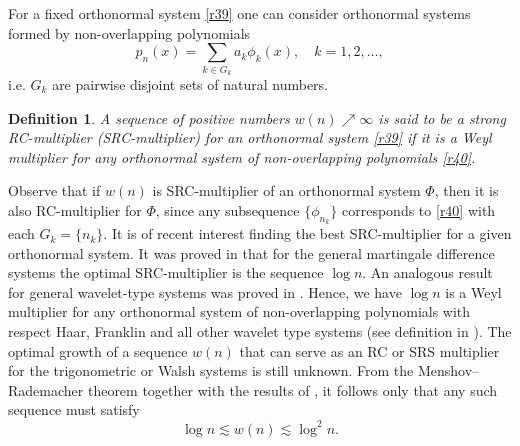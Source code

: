 \documentclass[12pt,reqno,fleqn]{amsart}
\theoremstyle{plain} %
\theoremstyle{remark}
\theoremstyle{plain}
\newtheorem{definition}{Definition}[section]
\numberwithin{equation}{section}
\newcommand {\e }[1]{\eqref{#1}}
\begin{document}
For a fixed orthonormal system \e{r39} one can consider orthonormal systems formed by non-overlapping polynomials
\begin{equation}\label{r40}
	p_n(x)=\sum_{k\in G_k}a_k\phi_k(x),\quad k=1,2,\ldots,
\end{equation}
i.e. $G_k$ are pairwise disjoint sets of natural numbers. 

\begin{definition}
	A sequence of positive numbers $w(n)\nearrow\infty$ is said to be a strong RC-multiplier (SRC-multiplier) for an orthonormal system \e{r39} if it is a  Weyl multiplier for any orthonormal system of non-overlapping polynomials \e{r40}.
\end{definition}
Observe that if $w(n)$ is SRC-multiplier of an orthonormal system $\Phi$, then it is also RC-multiplier for $\Phi$, since any subsequence $\{\phi_{n_k}\}$ corresponds to  \e{r40} with each $G_k=\{n_k\}$. 
It is of recent interest finding the best SRC-multiplier for a given orthonormal system. It was proved in \cite{Kar1} that for the general martingale difference systems the optimal SRC-multiplier is the sequence $\log n$. An analogous result for general wavelet-type systems was proved in \cite{KaKa}.
Hence, we have $\log n$ is a Weyl multiplier for any orthonormal system of non-overlapping polynomials with respect Haar, Franklin and all other wavelet type systems (see definition in \cite{KaKa}). The optimal growth of a sequence $w(n)$ that can serve as an RC or SRS multiplier for the trigonometric or Walsh systems is still unknown. From the Menshov–Rademacher theorem together with the results of \cite{Boch, Nak3, Kar5}, it follows only that any such sequence must satisfy 
\begin{equation}\label{x24}
	\log n\lesssim w(n)\lesssim \log^2 n. 
\end{equation} 
\end{document}
